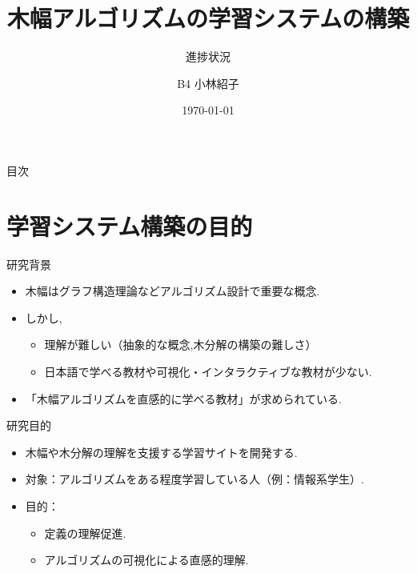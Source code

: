 \documentclass[aspectratio=169]{beamer}
\begin{document}
\title{\Large 木幅アルゴリズムの学習システムの構築}
\subtitle{進捗状況} 
\author{\small B4 小林紹子} %
\date{\small\today} %

\begin{frame}
    \titlepage
\end{frame}

\begin{frame}{目次}
    \tableofcontents
\end{frame}

\section{学習システム構築の目的}

\begin{frame}{研究背景}
    \begin{itemize}
        \setlength{\parskip}{1.5em}
        \item 木幅はグラフ構造理論などアルゴリズム設計で重要な概念.
        \item しかし,
        \begin{itemize}
            \setlength{\parskip}{1em}
            \item 理解が難しい（抽象的な概念,木分解の構築の難しさ）
            \item 日本語で学べる教材や可視化・インタラクティブな教材が少ない.
        \end{itemize}
        \item \Rightarrow 「木幅アルゴリズムを直感的に学べる教材」が求められている.
    \end{itemize}
\end{frame}

\begin{frame}{研究目的}
    \begin{itemize}
        \setlength{\parskip}{1.5em}
        \item 木幅や木分解の理解を支援する学習サイトを開発する.
        \item 対象：アルゴリズムをある程度学習している人（例：情報系学生）.
        \item 目的：
        \begin{itemize}
            \setlength{\parskip}{1.5em}
            \item 定義の理解促進.
            \item アルゴリズムの可視化による直感的理解.
        \end{itemize}
    \end{itemize}
\end{frame}
\end{document}
